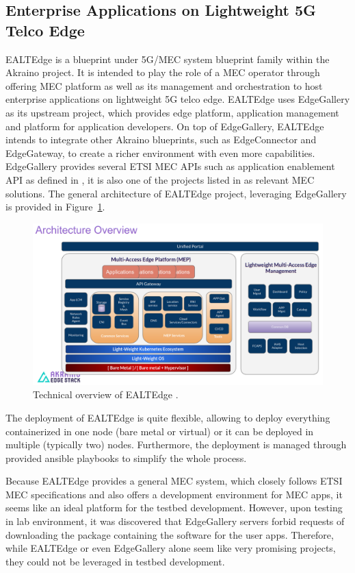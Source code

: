 \documentclass[12pt,a4paper,twoside]{report}
\begin{document}
\subsection{Enterprise Applications on Lightweight 5G Telco Edge}
EALTEdge is a blueprint under 5G/MEC system blueprint family within the Akraino project. It is intended to play the role of a MEC operator through offering MEC platform as well as its management and orchestration to host enterprise applications on lightweight 5G telco edge. EALTEdge uses EdgeGallery as its upstream project, which provides edge platform, application management and platform for application developers. On top of EdgeGallery, EALTEdge intends to integrate other Akraino blueprints, such as EdgeConnector and EdgeGateway, to create a richer environment with even more capabilities. EdgeGallery provides several ETSI MEC APIs such as application enablement API as defined in \cite{ETSI:GS:app-ena}, it is also one of the projects listed in \cite{mec-etsi-web} as relevant MEC solutions. The general architecture of EALTEdge project, leveraging EdgeGallery is provided in Figure~\ref{F:ealtedge}. \cite{ealtedge-docu} 
\begin{figure}[ht]
	\centering
	\includegraphics[width=13cm]{./images/akraino-ealtedge.png}
	\caption{Technical overview of EALTEdge \cite{ealtedge-docu}.}
	\label{F:ealtedge}
\end{figure}

The deployment of EALTEdge is quite flexible, allowing to deploy everything containerized in one node (bare metal or virtual) or it can be deployed in multiple (typically two) nodes. Furthermore, the deployment is managed through provided ansible playbooks to simplify the whole process.

Because EALTEdge provides a general MEC system, which closely follows ETSI MEC specifications and also offers a development environment for MEC apps, it seems like an ideal platform for the testbed development. However, upon testing in lab environment, it was discovered that EdgeGallery servers forbid requests of downloading the package containing the software for the user apps. Therefore, while EALTEdge or even EdgeGallery alone seem like very promising projects, they could not be leveraged in testbed development.
\end{document}
